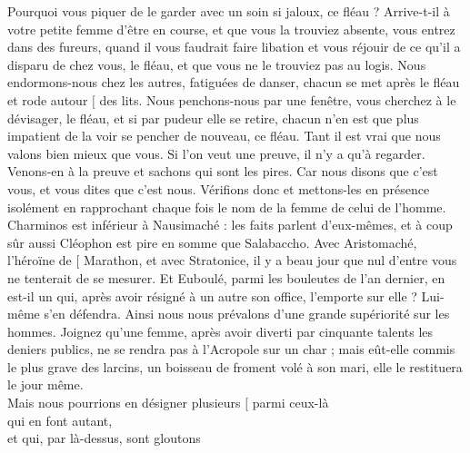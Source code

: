 \documentclass[12pt]{book}%
\newcommand{\passeLigne}[0]{\skipnumbering}%
\newcommand{\fin}[0]{\linebreak\passeLigne\protect\hfill $[$ }%
\newcommand{\ligne}[1]{\setline{#1}\hidenumbering}%
\newcommand{\espace}[1]{\hspace{#1}}%
\newcommand{\francais}[1]{{\policeFr #1}}%
\newcommand{\anapFr}[1]{%
\hangindent=70pt%
\espace{50pt}%
\francais{#1%
}}%
\newcommand{\tetramAnapFr}[1]{%
\hangindent=20pt%
\espace{0pt}%
\francais{#1%
}}%
\newenvironment{groupe}{%
\pstart%
\ledgroup%
}{%
\pend %
}%
\begin{document}
\begin{pages}
\begin{Rightside}
\begin{groupe}
{Pourquoi vous piquer de le garder avec un soin si jaloux, ce fléau ?
\ligne{792}Arrive-t-il à votre petite femme d'être en course, et que vous la trouviez absente,
vous entrez dans des fureurs, quand il vous faudrait faire libation et vous réjouir
de ce qu'il a disparu de chez vous, le fléau, et que vous ne le trouviez pas au logis.
Nous endormons-nous chez les autres, fatiguées de danser,
chacun se met après le fléau et rode autour \fin des lits.}
\end{groupe}%
\begin{groupe}%
\tetramAnapFr{\ligne{796}Nous penchons-nous par une fenêtre, vous cherchez à le dévisager, le fléau,
et si par pudeur elle se retire, chacun n'en est que plus impatient
\ligne{797}de la voir se pencher de nouveau, ce fléau. Tant il est vrai que nous valons bien mieux
que vous. Si l'on veut une preuve, il n'y a qu'à regarder.
Venons-en à la preuve et sachons qui sont les pires. Car nous disons que c'est vous,}
\end{groupe}%
\begin{groupe}%
\tetramAnapFr{et vous dites que c'est nous. Vérifions donc et mettons-les en présence isolément
en rapprochant chaque fois le nom de la femme de celui de l'homme.
Charminos est inférieur à Nausimaché : les faits parlent d'eux-mêmes,
et à coup sûr aussi Cléophon est pire en somme que Salabaccho.
Avec Aristomaché, l'héroïne de \fin Marathon,}
\end{groupe}%
\begin{groupe}%
\tetramAnapFr{\ligne{806}et avec Stratonice, il y a beau jour que nul d'entre vous ne tenterait de se mesurer.
\ligne{807}Et Euboulé, parmi les bouleutes de l'an dernier, en est-il un qui,
après avoir résigné à un autre son office, l'emporte sur elle ? Lui-même s'en défendra.
Ainsi nous nous prévalons d'une grande supériorité sur les hommes.
Joignez qu'une femme, après avoir diverti par cinquante talents les deniers publics,
ne se rendra pas à l'Acropole sur un char ; mais eût-elle commis le plus grave des larcins,
%
un boisseau de froment volé à son mari, elle le restituera le jour même.\\\passeLigne}%
\end{groupe}%
\begin{groupe}%
\anapFr{\ligne{814}Mais nous pourrions en désigner plusieurs \fin parmi ceux-là\\
qui en font autant,\\
et qui, par là-dessus, sont gloutons\\
}
\end{groupe}
\end{Rightside}
\end{pages}
\end{document}
